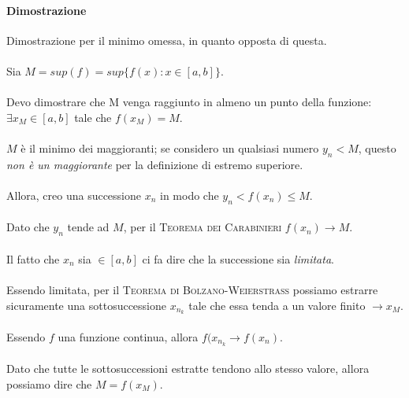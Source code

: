 \documentclass{article}
\begin{document}
\paragraph{Dimostrazione}
\footnotesize Dimostrazione per il minimo omessa, in quanto opposta di questa.\\\\\normalsize
Sia \(M = sup(f) = sup \{f(x) : x \in [a, b]\}\).\\\\
Devo dimostrare che M venga raggiunto in almeno un punto della funzione: \(\exists x_M \in [a, b]\) tale che \(f(x_M) = M\).\\\\
\(M\) è il minimo dei maggioranti; se considero un qualsiasi numero \(y_n < M\), questo \textit{non è un maggiorante} per la definizione di estremo superiore.\\\\
Allora, creo una successione \(x_n\) in modo che \(y_n < f(x_n) \leq M\).\\\\
Dato che \(y_n\) tende ad \(M\), per il \textsc{Teorema dei Carabinieri} \(f(x_n) \to M\).\\\\
Il fatto che \(x_n\) sia \(\in [a, b]\) ci fa dire che la successione sia \textit{limitata}.\\\\
Essendo limitata, per il \textsc{Teorema di Bolzano-Weierstrass} possiamo estrarre sicuramente una sottosuccessione \(x_{n_k}\) tale che essa tenda a un valore finito \(\to x_M\).\\\\
Essendo \(f\) una funzione continua, allora \(f(x_{n_k} \to f(x_n)\).\\\\
Dato che tutte le sottosuccessioni estratte tendono allo stesso valore, allora possiamo dire che \(M = f(x_M)\).
\end{document}
